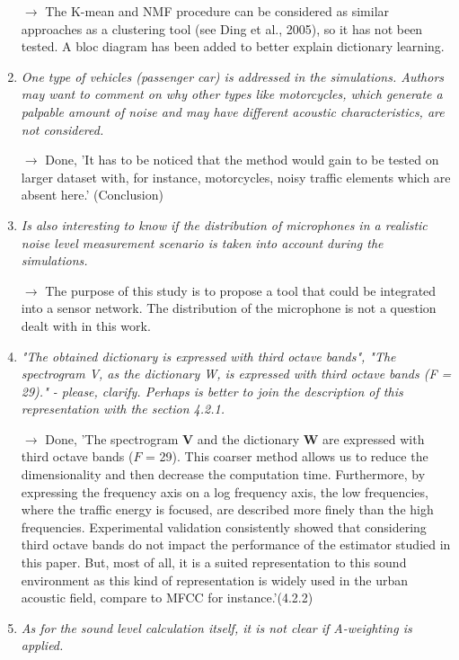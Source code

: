 \documentclass[10pt]{article}
\begin{document}
\begin{enumerate}
$\rightarrow$ The K-mean and NMF procedure can be considered as similar approaches as a clustering tool (see Ding et al., 2005), so it has not been tested.
A bloc diagram has been added to better explain dictionary learning.


\item \emph{One type of vehicles (passenger car) is addressed in the simulations. Authors may want to comment on why other types like motorcycles, which generate a palpable amount of noise and may have different acoustic characteristics, are not considered.}

$\rightarrow$ Done, 'It has to be noticed that the method would gain to be tested on larger dataset with, for instance, motorcycles, noisy traffic elements which are absent here.' (Conclusion)

\item \emph{Is also interesting to know if the distribution of microphones in a realistic noise level measurement scenario is taken into account during the simulations.}

$\rightarrow$ The purpose of this study is to propose a tool that could be integrated into a sensor network. The distribution of the microphone is not a question dealt with in this work.

\item \emph{"The obtained dictionary is expressed with third octave bands", "The spectrogram V, as the dictionary W, is expressed with third octave bands (F = 29)." - please, clarify. Perhaps is better to join the description of this representation with the section 4.2.1.}

$\rightarrow$ Done, 'The spectrogram $\mathbf{V}$ and the dictionary $\mathbf{W}$ are expressed with third octave bands ($F$ = 29). This coarser method allows us to reduce the dimensionality and then decrease the computation time. Furthermore, by expressing the frequency axis on a log frequency axis, the low frequencies, where the traffic energy is focused, are described more finely than the high frequencies. Experimental validation consistently showed that considering third octave bands do not impact the performance of the estimator studied in this paper. But, most of all, it is a suited representation to this sound environment as this kind of representation is widely used in the urban acoustic field, compare to MFCC for instance.'(4.2.2)

\item \emph{As for the sound level calculation itself, it is not clear if A-weighting is applied.}


\end{enumerate}
\end{document}

